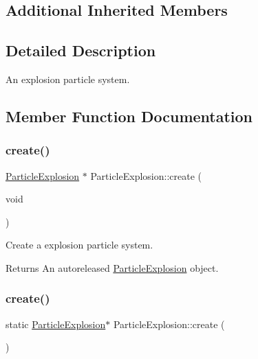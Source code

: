\subsection*{Additional Inherited Members}


\subsection{Detailed Description}
An explosion particle system. 

\subsection{Member Function Documentation}
\mbox{\label{classParticleExplosion_a9b7e6d03b2119876c653df67be08918b}} 
\subsubsection{\texorpdfstring{create()}{create()}\hspace{0.1cm}{\footnotesize\ttfamily [1/2]}}
{\footnotesize\ttfamily \hyperlink{classParticleExplosion}{Particle\+Explosion} $\ast$ Particle\+Explosion\+::create (\begin{DoxyParamCaption}\item[{void}]{ }\end{DoxyParamCaption})\hspace{0.3cm}{\ttfamily [static]}}

Create a explosion particle system.

\begin{DoxyReturn}{Returns}
An autoreleased \hyperlink{classParticleExplosion}{Particle\+Explosion} object. 
\end{DoxyReturn}
\mbox{\label{classParticleExplosion_a90b26ce031c26771bcfa489ba87839fe}} 
\subsubsection{\texorpdfstring{create()}{create()}\hspace{0.1cm}{\footnotesize\ttfamily [2/2]}}
{\footnotesize\ttfamily static \hyperlink{classParticleExplosion}{Particle\+Explosion}$\ast$ Particle\+Explosion\+::create (\begin{DoxyParamCaption}{ }\end{DoxyParamCaption})\hspace{0.3cm}{\ttfamily [static]}}

